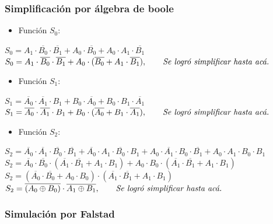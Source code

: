 \subsubsection{Simplificación por álgebra de boole}
\begin{itemize}[nosep]\item Función $S_0$: \end{itemize}
\begin{center}
$S_0 = A_1\cdot\overline{B_0}\cdot\overline{B_1}+A_0\cdot\overline{B_0}+A_0\cdot{}A_1\cdot\overline{B_1}$\\[10pt]
$S_0 = A_1\cdot{}\overline{B_0}\cdot{}\overline{B_1}+A_0\cdot{}(\overline{B_0}+A_1\cdot{}\overline{B_1}),\qquad{}\text{\textit{Se logró simplificar hasta acá.}}$ \\[10pt]
\end{center}

\begin{itemize}[nosep]\item Función $S_1$: \end{itemize}
\begin{center}
    $S_1 = \overline{A_0}\cdot\overline{A_1}\cdot{}B_1+B_0\cdot{}\overline{A_0}+B_0\cdot{}B_1\cdot\overline{A_1}$\\[10pt]
    $S_1 = \overline{A_0}\cdot\overline{A_1}\cdot{}B_1+B_0\cdot{}(\overline{A_0}+B_1\cdot{}\overline{A_1}),\qquad{}\text{\textit{Se logró simplificar hasta acá.}}$
\end{center}

\begin{itemize}[nosep]\item Función $S_2$: \end{itemize}
\begin{center}
$S_2 = \overline{A_0}\cdot\overline{A_1}\cdot\overline{B_0}\cdot\overline{B_1} + \overline{A_0}\cdot{}A_1\cdot{}\overline{B_0}\cdot{}B_1+A_0\cdot{}\overline{A_1}\cdot{}B_0\cdot\overline{B_1}+A_0\cdot{}A_1\cdot{}B_0\cdot{}B_1$ \\[10pt]
$S_2 = \overline{A_0}\cdot\overline{B_0}\cdot{}(\overline{A_1}\cdot{}\overline{B_1}+A_1\cdot{}B_1)+A_0\cdot{}B_0\cdot{}(\overline{A_1}\cdot\overline{B_1}+A_1\cdot{}B_1)$ \\[10pt]
$S_2 = (\overline{A_0}\cdot\overline{B_0}+A_0\cdot{}B_0)\cdot{}(\overline{A_1}\cdot\overline{B_1}+A_1\cdot{}B_1)$ \\[10pt]
$S_2 = \overline{(A_0\oplus{}B_0)}\cdot{}\overline{A_1\oplus{}B_1},\qquad{}\text{\textit{Se logró simplificar hasta acá.}}$
\end{center}
\subsubsection{Simulación por Falstad}
